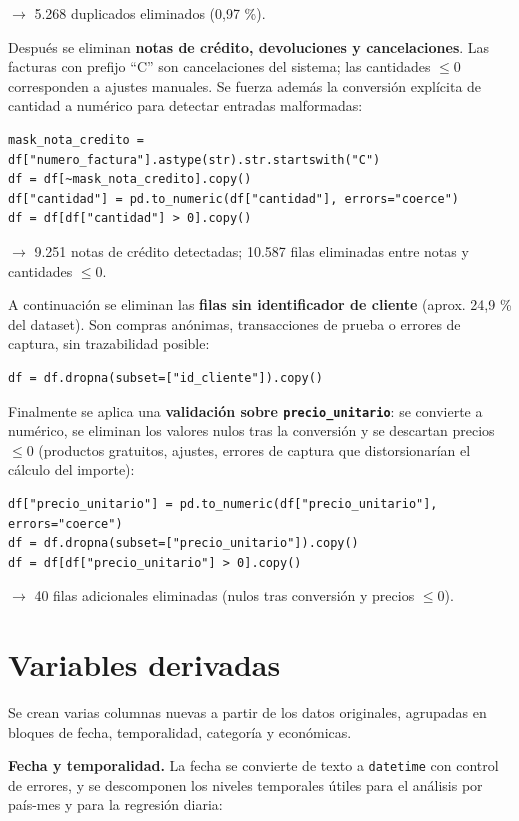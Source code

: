 \documentclass[11pt,a4paper]{article}
\begin{document}
\noindent$\rightarrow$ 5.268 duplicados eliminados (0,97 \%).

Después se eliminan \textbf{notas de crédito, devoluciones y cancelaciones}. Las facturas con prefijo ``C'' son cancelaciones del sistema; las cantidades $\leq 0$ corresponden a ajustes manuales. Se fuerza además la conversión explícita de cantidad a numérico para detectar entradas malformadas:

\begin{lstlisting}
mask_nota_credito = df["numero_factura"].astype(str).str.startswith("C")
df = df[~mask_nota_credito].copy()
df["cantidad"] = pd.to_numeric(df["cantidad"], errors="coerce")
df = df[df["cantidad"] > 0].copy()
\end{lstlisting}

\noindent$\rightarrow$ 9.251 notas de crédito detectadas; 10.587 filas eliminadas entre notas y cantidades $\leq 0$.

A continuación se eliminan las \textbf{filas sin identificador de cliente} (aprox. 24,9 \% del dataset). Son compras anónimas, transacciones de prueba o errores de captura, sin trazabilidad posible:

\begin{lstlisting}
df = df.dropna(subset=["id_cliente"]).copy()
\end{lstlisting}

Finalmente se aplica una \textbf{validación sobre \texttt{precio\_unitario}}: se convierte a numérico, se eliminan los valores nulos tras la conversión y se descartan precios $\leq 0$ (productos gratuitos, ajustes, errores de captura que distorsionarían el cálculo del importe):

\begin{lstlisting}
df["precio_unitario"] = pd.to_numeric(df["precio_unitario"], errors="coerce")
df = df.dropna(subset=["precio_unitario"]).copy()
df = df[df["precio_unitario"] > 0].copy()
\end{lstlisting}

\noindent$\rightarrow$ 40 filas adicionales eliminadas (nulos tras conversión y precios $\leq 0$).

\section{Variables derivadas}

Se crean varias columnas nuevas a partir de los datos originales, agrupadas en bloques de fecha, temporalidad, categoría y económicas.

\textbf{Fecha y temporalidad.} La fecha se convierte de texto a \texttt{datetime} con control de errores, y se descomponen los niveles temporales útiles para el análisis por país-mes y para la regresión diaria:
\end{document}
